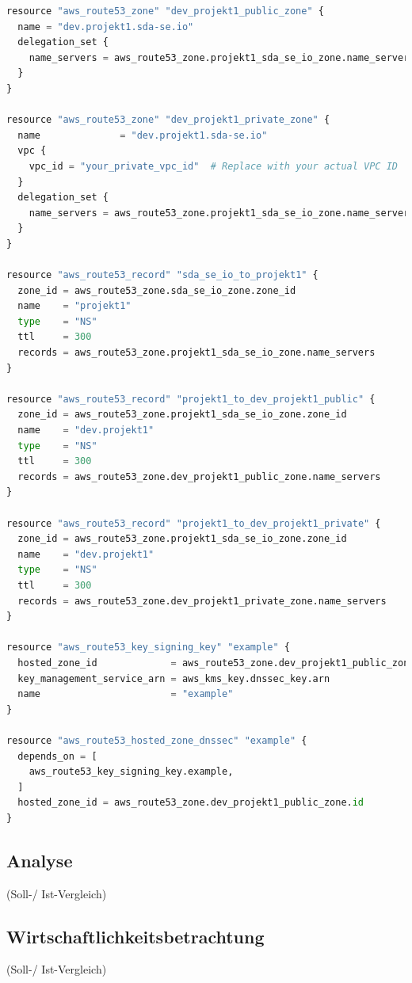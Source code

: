 \begin{lstlisting}[language=Python,frame=tb,caption={DNSSEC mit Terraform},label={lst:dnssec}]
resource "aws_route53_zone" "dev_projekt1_public_zone" {
  name = "dev.projekt1.sda-se.io"
  delegation_set {
    name_servers = aws_route53_zone.projekt1_sda_se_io_zone.name_servers
  }
}

resource "aws_route53_zone" "dev_projekt1_private_zone" {
  name              = "dev.projekt1.sda-se.io"
  vpc {
    vpc_id = "your_private_vpc_id"  # Replace with your actual VPC ID
  }
  delegation_set {
    name_servers = aws_route53_zone.projekt1_sda_se_io_zone.name_servers
  }
}

resource "aws_route53_record" "sda_se_io_to_projekt1" {
  zone_id = aws_route53_zone.sda_se_io_zone.zone_id
  name    = "projekt1"
  type    = "NS"
  ttl     = 300
  records = aws_route53_zone.projekt1_sda_se_io_zone.name_servers
}

resource "aws_route53_record" "projekt1_to_dev_projekt1_public" {
  zone_id = aws_route53_zone.projekt1_sda_se_io_zone.zone_id
  name    = "dev.projekt1"
  type    = "NS"
  ttl     = 300
  records = aws_route53_zone.dev_projekt1_public_zone.name_servers
}

resource "aws_route53_record" "projekt1_to_dev_projekt1_private" {
  zone_id = aws_route53_zone.projekt1_sda_se_io_zone.zone_id
  name    = "dev.projekt1"
  type    = "NS"
  ttl     = 300
  records = aws_route53_zone.dev_projekt1_private_zone.name_servers
}

resource "aws_route53_key_signing_key" "example" {
  hosted_zone_id             = aws_route53_zone.dev_projekt1_public_zone.id
  key_management_service_arn = aws_kms_key.dnssec_key.arn
  name                       = "example"
}

resource "aws_route53_hosted_zone_dnssec" "example" {
  depends_on = [
    aws_route53_key_signing_key.example,
  ]
  hosted_zone_id = aws_route53_zone.dev_projekt1_public_zone.id
}

\end{lstlisting}

\subsection{Analyse}
\label{subsec:description:analyse}
(Soll-/ Ist-Vergleich)

\subsection{Wirtschaftlichkeitsbetrachtung}
\label{subsec:description:ergebnisse:wirtschaftlichkeitsbetrachtung}
(Soll-/ Ist-Vergleich)

